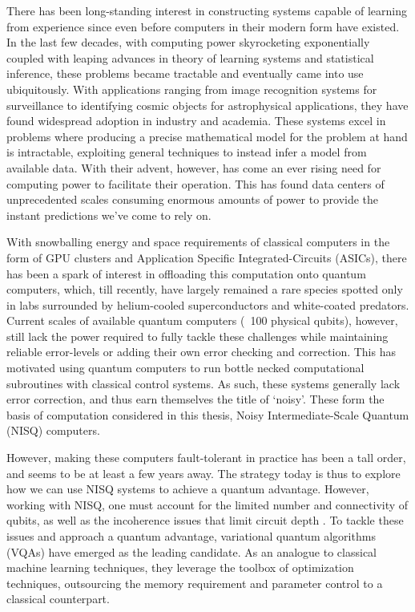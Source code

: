 
There has been long-standing interest in constructing systems capable of
learning from experience since even before computers in their modern form have
existed. In the last few decades, with computing power skyrocketing
exponentially coupled with leaping advances in theory of learning systems and
statistical inference, these problems became tractable and eventually came into
use ubiquitously. With applications ranging from image recognition systems for
surveillance to identifying cosmic objects for astrophysical applications, they
have found widespread adoption in industry and academia. These systems excel in
problems where producing a precise mathematical model for the problem at hand is
intractable, exploiting general techniques to instead infer a model from
available data. With their advent, however, has come an ever rising need for
computing power to facilitate their operation. This has found data centers of
unprecedented scales consuming enormous amounts of power to provide the instant
predictions we've come to rely on.

With snowballing energy and space requirements of classical computers in the
form of GPU clusters and Application Specific Integrated-Circuits (ASICs), there
has been a spark of interest in offloading this computation onto quantum
computers, which, till recently, have largely remained a rare species spotted
only in labs surrounded by helium-cooled superconductors and white-coated
predators. Current scales of available quantum computers (~100 physical qubits),
however, still lack the power required to fully tackle these challenges while
maintaining reliable error-levels or adding their own error checking and
correction. This has motivated using quantum computers to run bottle necked
computational subroutines with classical control systems. As such, these systems
generally lack error correction, and thus earn themselves the title of `noisy'.
These form the basis of computation considered in this thesis, Noisy
Intermediate-Scale Quantum (NISQ) computers.

However, making these computers fault-tolerant in practice has been a tall
order, and seems to be at least a few years away. The strategy today is thus to
explore how we can use NISQ systems to achieve a quantum advantage. However,
working with NISQ, one must account for the limited number and connectivity of
qubits, as well as the incoherence issues that limit circuit depth
\cite{cerezo2021vqa}. To tackle these issues and approach a quantum advantage,
variational quantum algorithms (VQAs) have emerged as the leading candidate. As
an analogue to classical machine learning techniques, they leverage the toolbox
of optimization techniques, outsourcing the memory requirement and parameter
control to a classical counterpart. 

